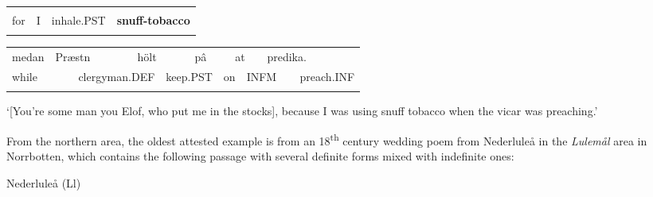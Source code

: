 \begin{tabular}{llll}
\lsptoprule
\multicolumn{4}{l}{för

}\\
for & I & inhale.PST & {\bfseries snuff-tobacco}\\
\lspbottomrule
\end{tabular}

\begin{tabular}{llllllllllll}
\lsptoprule
medan & \multicolumn{2}{l}{Præstn

} & \multicolumn{2}{l}{hölt

} & \multicolumn{2}{l}{pâ

} & \multicolumn{2}{l}{at

} & \multicolumn{2}{l}{predika.

} & \\
\multicolumn{2}{l}{while

} & \multicolumn{2}{l}{clergyman.DEF

} & \multicolumn{2}{l}{keep.PST

} & \multicolumn{2}{l}{on 

} & \multicolumn{2}{l}{INFM

} & \multicolumn{2}{l}{preach.INF

}\\
\lspbottomrule
\end{tabular}

\begin{styleTranslation}
 ‘[You’re some man you Elof, who put me in the stocks], because I was using snuff tobacco when the vicar was preaching.’

\end{styleTranslation}

\begin{styleBodyTextFirst}
From the northern area, the oldest attested example is from an 18\textsuperscript{th} century wedding poem from Nederluleå in the \textit{Lulemål} area in Norrbotten, which contains the following passage with several definite forms mixed with indefinite ones:

\end{styleBodyTextFirst}


\begin{listWWNumileveli}
\item 

\begin{styleExample}
Nederluleå (Ll)

\end{styleExample}

\end{listWWNumileveli}


